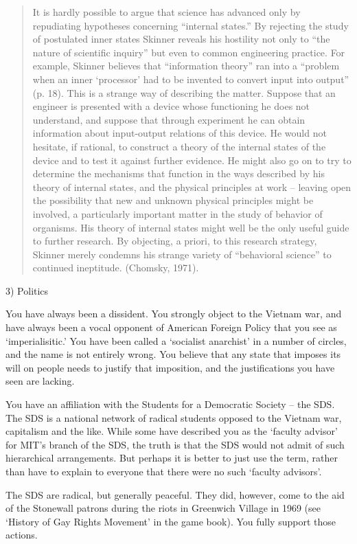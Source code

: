 \begin{refsection}
\begin{quote}
It is hardly possible to argue that science has advanced only by repudiating hypotheses concerning ``internal states.'' By rejecting the study of postulated inner states Skinner reveals his hostility not only to ``the nature of scientific inquiry'' but even to common engineering practice. For example, Skinner believes that ``information theory'' ran into a ``problem when an inner `processor' had to be invented to convert input into output'' (p. 18).
This is a strange way of describing the matter. Suppose that an engineer is presented with a device whose functioning he does not understand, and suppose that through experiment he can obtain information about input-output relations of this device. He would not hesitate, if rational, to construct a theory of the internal states of the device and to test it against further evidence. He might also go on to try to determine the mechanisms that function in the ways described by his theory of internal states, and the physical principles at work -- leaving open the possibility that new and unknown physical principles might be involved, a particularly important matter in the study of behavior of organisms. His theory of internal states might well be the only useful guide to further research. By objecting, a priori, to this research strategy, Skinner merely condemns his strange variety of ``behavioral science'' to continued ineptitude. (Chomsky, 1971).
\end{quote}

3) Politics

You have always been a dissident. You strongly object to the Vietnam war, and have always been a vocal opponent of American Foreign Policy that you see as ‘imperialisitic.’ You have been called a ‘socialist anarchist’ in a number of circles, and the name is not entirely wrong. You believe that any state that imposes its will on people needs to justify that imposition, and the justifications you have seen are lacking.

You have an affiliation with the Students for a Democratic Society – the SDS. The SDS is a national network of radical students opposed to the Vietnam war, capitalism and the like. While some have described you as the ‘faculty advisor’ for MIT’s branch of the SDS, the truth is that the SDS would not admit of such hierarchical arrangements. But perhaps it is better to just use the term, rather than have to explain to everyone that there were no such ‘faculty advisors’.

The SDS are radical, but generally peaceful. They did, however, come to the aid of the Stonewall patrons during the riots in Greenwich Village in 1969 (see ‘History of Gay Rights Movement’ in the game book). You fully support those actions.


\end{refsection}
